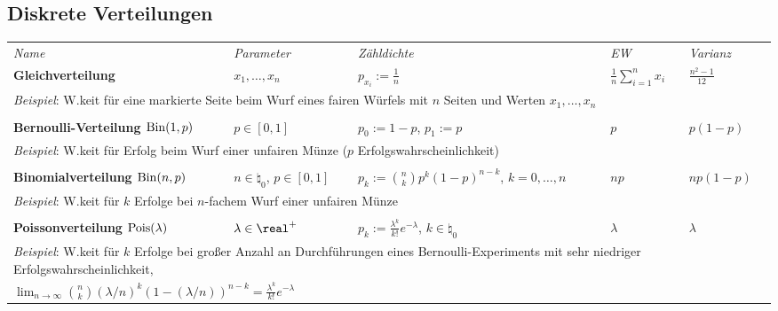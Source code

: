 \pagebreak

\begin{landscape}
\section{%
    Diskrete Verteilungen%
}

\begin{tabular}{p{85mm}p{40mm}p{65mm}p{20mm}p{27mm}}
    \toprule
    \emph{Name} & \emph{Parameter} & \emph{Zähldichte} & \emph{EW} & \emph{Varianz}\\

    \addlinespace[5mm]
    \midrule
    \textbf{Gleichverteilung} &
    $x_1, \dotsc, x_n$ &
    $p_{x_i} := \frac{1}{n}$ &
    $\frac{1}{n} \sum_{i=1}^n x_i$ &
    $\frac{n^2 - 1}{12}$\\
    \multicolumn{5}{l}{\emph{Beispiel}:
    W.keit für eine markierte Seite beim Wurf eines fairen Würfels mit $n$ Seiten und
    Werten $x_1, \dotsc, x_n$}\\
    \multicolumn{5}{l}{}\\

    \addlinespace[5mm]
    \midrule
    \textbf{Bernoulli-Verteilung $\operatorname{Bin}(1, p)$} &
    $p \in [0, 1]$ &
    $p_0 := 1-p$, $p_1 := p$ &
    $p$ &
    $p(1-p)$\\
    \multicolumn{5}{l}{\emph{Beispiel}:
    W.keit für Erfolg beim Wurf einer unfairen Münze ($p$ Erfolgswahrscheinlichkeit)}\\
    \multicolumn{5}{l}{}\\

    \addlinespace[5mm]
    \midrule
    \textbf{Binomialverteilung $\operatorname{Bin}(n, p)$} &
    $n \in \natural_0$, $p \in [0, 1]$ &
    $p_k := \binom{n}{k} p^k (1-p)^{n-k}$, $k = 0, \dotsc, n$ &
    $np$ &
    $np(1-p)$\\
    \multicolumn{5}{l}{\emph{Beispiel}:
    W.keit für $k$ Erfolge bei $n$-fachem Wurf einer unfairen Münze}\\
    \multicolumn{5}{l}{}\\

    \addlinespace[5mm]
    \midrule
    \textbf{Poissonverteilung $\operatorname{Pois}(\lambda)$} &
    $\lambda \in \real^+$ &
    $p_k := \frac{\lambda^k}{k!} e^{-\lambda}$, $k \in \natural_0$ &
    $\lambda$ &
    $\lambda$\\
    \multicolumn{5}{l}{\emph{Beispiel}:
    W.keit für $k$ Erfolge bei großer Anzahl an Durchführungen eines
    Bernoulli-Experiments mit sehr niedriger Erfolgswahrscheinlichkeit,}\\
    \multicolumn{5}{l}{$\lim_{n \to \infty}
    \binom{n}{k} (\lambda/n)^k (1-(\lambda/n))^{n-k} = \frac{\lambda^k}{k!} e^{-\lambda}$}
    \\


\end{tabular}
\end{landscape}
